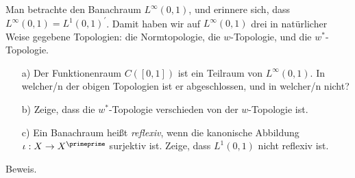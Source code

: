 \begin{exercise}
Man betrachte den Banachraum $L^{\infty}(0,1)$, und erinnere sich, dass
$L^{\infty}(0,1) = L^1(0,1)^{\prime}$. Damit haben wir auf $L^{\infty}(0,1)$ drei
in natürlicher Weise gegebene Topologien: die Normtopologie, die $w$-Topologie,
und die $w^*$-Topologie.
\begin{itemize}
  \item [a)] Der Funktionenraum $C([0,1])$ ist ein Teilraum von $L^{\infty}(0,1)$.
  In welcher/n der obigen Topologien ist er abgeschlossen, und in welcher/n nicht?
  \item [b)] Zeige, dass die $w^*$-Topologie verschieden von der $w$-Topologie ist.
  \item [c)] Ein Banachraum heißt \textit{reflexiv}, wenn die kanonische Abbildung
  $\iota: X \rightarrow X^{\primeprime}$ surjektiv ist. Zeige, dass $L^1(0,1)$ nicht
  reflexiv ist.
\end{itemize}

\end{exercise}

\begin{solution}
Beweis.


\end{solution}

